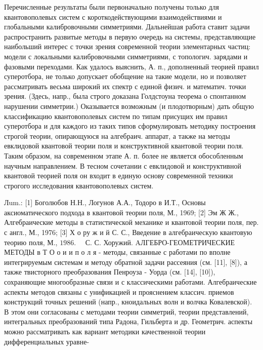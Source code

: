 \documentclass[10pt]{article}
\begin{document}
Перечисленные результаты были первоначально получены только для квантовополевых систем с короткодействующими взаимодействиями и глобальными калибровочными симметриями. Дальнейшая работа ставит задачи распространить развитые методы в первую очередь на системы, представляющие наибольший интерес с точки зрения современной теории элементарных частиц: модели с локальными калибровочными симметриями, с топологич. зарядами и фазовыми переходами. Как удалось выяснить, А. п., дополненный теорией правил суперотбора, не только допускает обобщение на такие модели, но и позволяет рассматривать весьма широкий их спектр с единой физич. и математич. точки зрения. (Здесь, напр., была строго доказана Голдстоуна теорема о спонтанном нарушении симметрии.) Оказывается возможным (и плодотворным) дать общую классификацию квантовополевых систем по типам присущих им правил суперотбора и для каждого из таких типов сформулировать методику построения строгой теории, опирающуюся на алгебраич. аппарат, а также на методы евклидовой квантовой теории поля и конструктивной квантовой теории поля. Таким образом, на современном этапе А. п. более не является обособленным научным направлением. В тесном сочетании с евклидовой и конструктивной квантовой теорией поля он входит в единую основу современной техники строгого исследования квантовополевых систем.



Лum.: [1] Боголюбов Н.Н., Логунов А.А., Тодоро в И.Т., Основы аксиоматического подхода в квантовой теории поля, М., 1969; [2] Эм Ж Ж., Алгебраические методы в статистической механике и квантовой теории поля, пер. с англ., М., 1976; [3] Х о ру ж и й С. С., Введение в алгебраическую квантовую теорию поля, М., $1986 . \quad$ С. С. Хоружий. AЛГЕБРО-ГЕОМЕТРИЧЕСКИЕ МЕТОДЫ в Т О о и и п о л я - методы, связанные с работами по вполне интегрируемым системам и методу обратной задачи рассеяния (см. [11], [8]), а также твисторного преобразования Пенроуза - Уорда (см. [14], [10]), сохраняющие многообразные связи и с классическими работами. Алгебраические аспекты методов связаны с унификацией и прояснением классич. приемов конструкций точных решений (напр., кноидальных волн и волчка Ковалевской). В этом они согласованы с методами теории симметрий, теории представлений, интегральных преобразований типа Радона, Гильберта и др. Геометрич. аспекты можно рассматривать как вариант методики качественной теории дифференциальных уравне-
\end{document}
